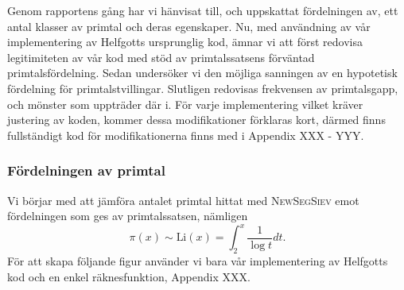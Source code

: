 


Genom rapportens gång har vi hänvisat till, och uppskattat fördelningen av, ett antal klasser av primtal och deras egenskaper. 
Nu, med användning av vår implementering av Helfgotts ursprunglig kod, ämnar vi att först redovisa legitimiteten av vår kod med stöd av primtalssatsens förväntad primtalsfördelning. 
Sedan undersöker vi den möjliga sanningen av en hypotetisk fördelning för primtalstvillingar. 
Slutligen redovisas frekvensen av primtalsgapp, och mönster som uppträder där i.
För varje implementering vilket kräver justering av koden, kommer dessa modifikationer förklaras kort, därmed finns fullständigt kod för modifikationerna finns med i Appendix XXX - YYY.

\subsubsection{Fördelningen av primtal}\label{app.primes.title}

Vi börjar med att jämföra antalet primtal hittat med \textsc{NewSegSiev} emot fördelningen som ges av primtalssatsen, nämligen
\begin{equation}
    \pi(x) \sim \text{Li}(x) = \int_2^x\frac{1}{\log t}dt\label{app.primes.PNT}.
\end{equation}
För att skapa följande figur använder vi bara vår implementering av Helfgotts kod och en enkel räknesfunktion, Appendix XXX.

